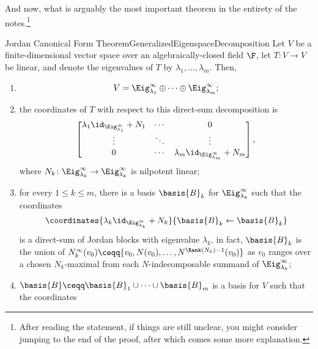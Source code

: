 And now, what is arguably the most important theorem in the entirety of the notes.\footnote{After reading the statement, if things are still unclear, you might consider jumping to the end of the proof, after which comes some more explanation.}
\begin{thm}{Jordan Canonical Form Theorem}{GeneralizedEigenspaceDecomposition}
	Let $V$ be a finite-dimensional vector space over an algebraically-closed field $\F$, let $T\colon V\rightarrow V$ be linear, and denote the eigenvalues of $T$ by $\lambda _1,\ldots ,\lambda _m$.  Then,
	\begin{enumerate}
		\item \label{GeneralizedEigenspaceDecomposition(i)}
		\begin{equation}\label{eqn4.4.173}
			V=\Eig _{\lambda _1}^{\infty}\oplus \cdots \oplus \Eig _{\lambda _m}^{\infty};
		\end{equation}
		\item \label{GeneralizedEigenspaceDecomposition(ii)}the coordinates of $T$ with respect to this direct-sum decomposition is
		\begin{equation}
			\begin{bmatrix}\lambda _1\id _{\Eig _{\lambda _1}^{\infty}}+N_1 & \cdots & 0 \\ \vdots & \ddots & \vdots \\ 0 & \cdots & \lambda _m\id _{\Eig _{\lambda _m}^{\infty}}+N_m\end{bmatrix},
		\end{equation}
		where $N_k\colon \Eig _{\lambda _k}^{\infty}\rightarrow \Eig _{\lambda _k}^{\infty}$ is nilpotent linear;
		\item \label{GeneralizedEigenspaceDecomposition(iii)}for every $1\leq k\leq m$, there is a basis $\basis{B}_k$ for $\Eig _{\lambda _k}^{\infty}$ such that the coordinates
		\begin{equation}\label{eqn4.4.175}
			\coordinates{\lambda _k\id _{\Eig _{\lambda _k}^{\infty}}+N_k}{\basis{B}_k\leftarrow \basis{B}_k}
		\end{equation}
		is a direct-sum of Jordan blocks with eigenvalue $\lambda _k$, in fact, $\basis{B}_k$ is the union of $N_k^{\infty}(v_0)\ceqq \{ v_0,N(v_0),\ldots ,N^{\Rank (N_k)-1}(v_0)\}$ as $v_0$ ranges over a chosen $N_k$-maximal from each $N$-indecomposable summand of $\Eig _{\lambda _k}^{\infty}$;
		\item \label{GeneralizedEigenspaceDecomposition(iv)}$\basis{B}\ceqq \basis{B}_1\cup \cdots \cup \basis{B}_m$ is a basis for $V$ such that the coordinates

\end{enumerate}
\end{thm}
